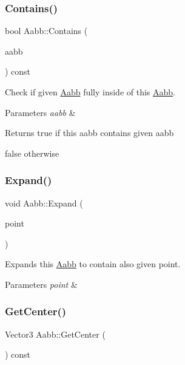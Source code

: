 \subsubsection{\texorpdfstring{Contains()}{Contains()}}
{\footnotesize\ttfamily bool Aabb\+::\+Contains (\begin{DoxyParamCaption}\item[{const \hyperlink{classAabb}{Aabb} \&}]{aabb }\end{DoxyParamCaption}) const}



Check if given \hyperlink{classAabb}{Aabb} fully inside of this \hyperlink{classAabb}{Aabb}. 


\begin{DoxyParams}{Parameters}
{\em aabb} & \\
\hline
\end{DoxyParams}
\begin{DoxyReturn}{Returns}
true if this aabb contains given aabb 

false otherwise 
\end{DoxyReturn}
\mbox{\label{classAabb_ac21813c88f72a56e142c984c3efde368}} 
\subsubsection{\texorpdfstring{Expand()}{Expand()}}
{\footnotesize\ttfamily void Aabb\+::\+Expand (\begin{DoxyParamCaption}\item[{const Vector3 \&}]{point }\end{DoxyParamCaption})}



Expands this \hyperlink{classAabb}{Aabb} to contain also given point. 


\begin{DoxyParams}{Parameters}
{\em point} & \\
\hline
\end{DoxyParams}
\mbox{\label{classAabb_a22fbf825e411bdcbf24c277f1f266d0c}} 
\subsubsection{\texorpdfstring{Get\+Center()}{GetCenter()}}
{\footnotesize\ttfamily Vector3 Aabb\+::\+Get\+Center (\begin{DoxyParamCaption}{ }\end{DoxyParamCaption}) const}



